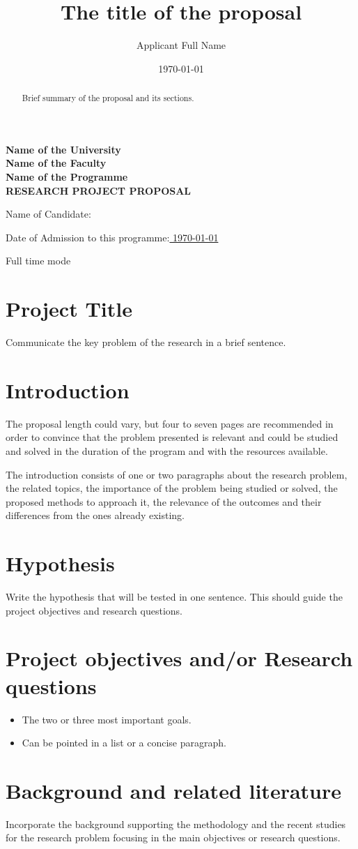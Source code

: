 \documentclass[
  11pt,
  a4paper,
  oneside
]{article}
\author{Applicant Full Name}
\date{\today}
\title{The title of the proposal}
\newcommand{\titlepart}{\thispagestyle{empty}
\pdfbookmark[0]{Front Page}{Front Page}
\label{sec:frontpage}
\begin{center}
\textbf{Name of the University\\
Name of the Faculty\\
Name of the Programme\\
\vspace{3ex}
RESEARCH PROJECT PROPOSAL}
\end{center}

\vspace{6ex}

Name of Candidate:\uline{
\phantom{xxxxxxxxxxxxxxxxxxx}
\theauthor
\hfill\phantom{x}}

\vspace{3ex}

Date of Admission to this programme:\uline{
\phantom{xxxxx}
\admissionDate
\hfill\phantom{x}}

\vspace{3ex}

\studyTimeMode

\leftskip=0.32in}
\newcommand{\admissionDate}{\today}
\newcommand{\studyTimeMode}{Full time mode}
\begin{document}
\titlepart

\begin{abstract}
    Brief summary of the proposal and its sections.
\end{abstract}

\section{Project Title}
Communicate the key problem of the research in a brief sentence.

\section{Introduction}
The proposal length could vary, but four to seven pages are recommended in order to convince that the problem presented is relevant and could be studied and solved in the duration of the program and with the resources available.

The introduction consists of one or two paragraphs about the research problem, the related topics, the importance of the problem being studied or solved, the proposed methods to approach it, the relevance of the outcomes and their differences from the ones already existing.

\section{Hypothesis}
Write the hypothesis that will be tested in one sentence. This should guide the project objectives and research questions.

\section{Project objectives and/or Research questions}
\begin{itemize}
    \item The two or three most important goals.
    \item Can be pointed in a list or a concise paragraph.
\end{itemize}

\section{Background and related literature}
Incorporate the background supporting the methodology and the recent studies for the research problem focusing in the main objectives or research questions.
\end{document}
